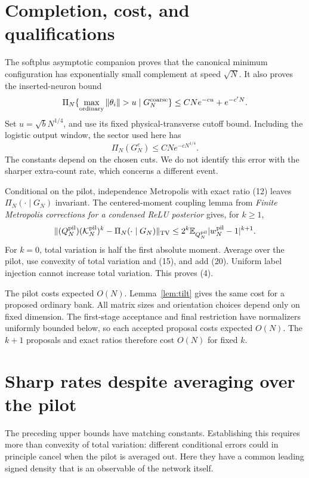 \documentclass[11pt]{article}
\newcommand{\E}{\mathbb E}\newcommand{\R}{\mathbb R}
\begin{document}
\section{Completion, cost, and qualifications}
The softplus asymptotic companion proves that the canonical minimum
configuration has exponentially small complement at speed $\sqrt N$.
It also proves the inserted-neuron bound
\[
 \Pi_N\{\max_{\rm ordinary}\|\theta_i\|>u\mid G_N^{\rm coarse}\}
                                      \le CN e^{-cu}+e^{-c'N}.
\]
Set $u=\sqrt b N^{1/4}$, and use its fixed physical-transverse cutoff
bound. Including the logistic output window, the sector used here has
\[
                  \Pi_N(G_N^c)\le CN e^{-cN^{1/4}}.       \tag{20}
\]
The constants depend on the chosen cuts. We do not identify this error
with the sharper extra-count rate, which concerns a different event.

Conditional on the pilot, independence Metropolis with exact ratio (12)
leaves $\Pi_N(\cdot\mid G_N)$ invariant. The centered-moment coupling
lemma from \emph{Finite Metropolis corrections for a condensed ReLU
posterior} gives, for $k\ge1$,
\[
 \|(Q_N^{\rm pil})(\mathcal K_N^{\rm pil})^k-
                       \Pi_N(\cdot\mid G_N)\|_{\TV}
 \le 2^k\E_{Q_N^{\rm pil}}|w_N^{\rm pil}-1|^{k+1}.
\]
For $k=0$, total variation is half the first absolute moment.
Average over the pilot, use convexity of total variation and (15), and
add (20). Uniform label injection cannot increase total variation.
This proves (4).

The pilot costs expected $O(N)$. Lemma~\ref{lem:tilt} gives the same
cost for a proposed ordinary bank. All matrix sizes and orientation
choices depend only on fixed dimension. The first-stage acceptance and
final restriction have normalizers uniformly bounded below, so each
accepted proposal costs expected $O(N)$. The $k+1$ proposals and exact
ratios therefore cost $O(N)$ for fixed $k$.

\section{Sharp rates despite averaging over the pilot}\label{sec:sharp}
The preceding upper bounds have matching constants. Establishing this
requires more than convexity of total variation: different conditional
errors could in principle cancel when the pilot is averaged out. Here
they have a common leading signed density that is an observable of the
network itself.
\end{document}

